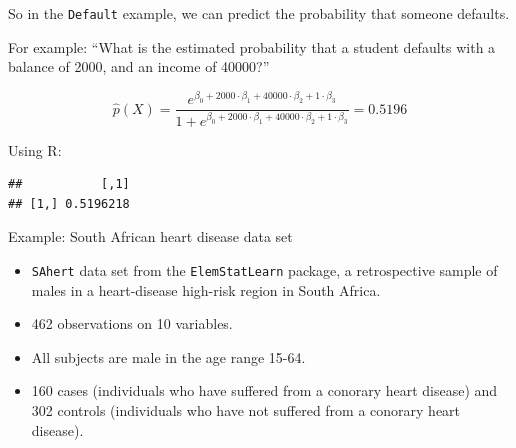 \documentclass[10pt,ignorenonframetext,]{beamer}
\newenvironment{Shaded}{\begin{snugshade}}{\end{snugshade}}
\newcommand{\KeywordTok}[1]{\textcolor[rgb]{0.13,0.29,0.53}{\textbf{#1}}}
\newcommand{\DecValTok}[1]{\textcolor[rgb]{0.00,0.00,0.81}{#1}}
\newcommand{\StringTok}[1]{\textcolor[rgb]{0.31,0.60,0.02}{#1}}
\newcommand{\OperatorTok}[1]{\textcolor[rgb]{0.81,0.36,0.00}{\textbf{#1}}}
\newcommand{\NormalTok}[1]{#1}
\begin{document}
\begin{frame}[fragile]

So in the \texttt{Default} example, we can predict the probability that
someone defaults.

For example: ``What is the estimated probability that a student defaults
with a balance of 2000, and an income of 40000?''

\[\hat{p}(X) = \frac{e^{\beta_0 + 2000 \cdot \beta_1 + 40000 \cdot \beta_2 + 1 \cdot \beta_3}}{ 1+  e^{\beta_0 + 2000 \cdot \beta_1 + 40000 \cdot \beta_2 + 1 \cdot \beta_3}} = 0.5196\]
\vspace{6mm}

Using R: \tiny

\begin{Shaded}
\end{Shaded}

\begin{verbatim}
##           [,1]
## [1,] 0.5196218
\end{verbatim}

\end{frame}

\begin{frame}[fragile]

\begin{block}{Example: South African heart disease data set}

\vspace{2mm}

\begin{itemize}
\item
  \texttt{SAhert} data set from the \texttt{ElemStatLearn} package, a
  retrospective sample of males in a heart-disease high-risk region in
  South Africa.
\item
  462 observations on 10 variables.
\item
  All subjects are male in the age range 15-64.
\item
  160 cases (individuals who have suffered from a conorary heart
  disease) and 302 controls (individuals who have not suffered from a
  conorary heart disease).
\end{itemize}

\end{block}

\end{frame}
\end{document}
